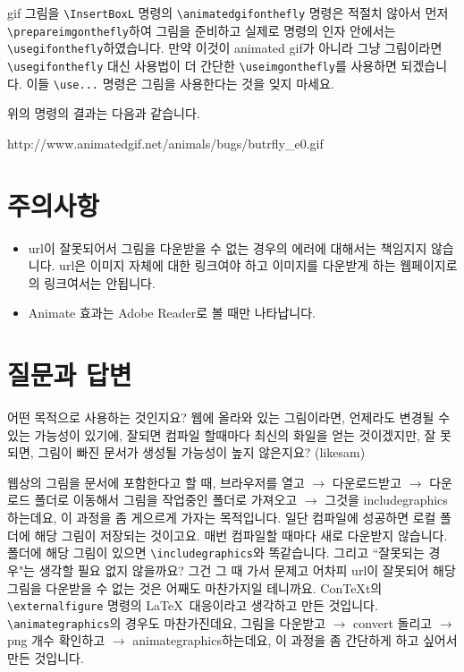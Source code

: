\documentclass[b5paper,nanum]{oblivoir}
\def\cs#1{\texttt{\textbackslash #1}}
\begin{document}
gif 그림을 \cs{InsertBoxL} 명령의  \cs{animatedgifonthefly} 명령은 적절치 않아서 먼저 \cs{prepareimgonthefly}하여 그림을 준비하고 실제로 명령의 인자 안에서는 \cs{usegifonthefly}하였습니다. 만약 이것이 animated gif가 아니라 그냥 그림이라면 \cs{usegifonthefly} 대신 사용법이 더 간단한 \cs{useimgonthefly}를 사용하면 되겠습니다. 이들 \cs{use...} 명령은  그림을 사용한다는 것을 잊지 마세요.

위의 명령의 결과는 다음과 같습니다.

\begin{framed}
%
   {http://www.animatedgif.net/animals/bugs/butrfly_e0.gif}%
%
\jiwon[1]
\end{framed}

\section{주의사항}

\begin{itemize}\firmlist
\item url이 잘못되어서 그림을 다운받을 수 없는 경우의 에러에 대해서는 책임지지 않습니다. url은 이미지 자체에 대한 링크여야 하고 이미지를 다운받게 하는 웹페이지로의 링크여서는 안됩니다.
\item Animate 효과는 Adobe Reader로 볼 때만 나타납니다.
\end{itemize}

\section{질문과 답변}
어떤 목적으로 사용하는 것인지요? 웹에 올라와 있는 그림이라면, 언제라도 변경될 수 있는 가능성이 있기에, 잘되면 컴파일 할때마다 최신의 화일을 얻는 것이겠지만, 잘 못되면, 그림이 빠진 문서가 생성될 가능성이 높지 않은지요? (likesam)

웹상의 그림을 문서에 포함한다고 할 때, 브라우저를 열고 $\rightarrow$ 다운로드받고 $\rightarrow$ 다운로드 폴더로 이동해서 그림을 작업중인 폴더로 가져오고 $\rightarrow$ 그것을 includegraphics하는데요, 이 과정을 좀 게으르게 가자는 목적입니다.
일단 컴파일에 성공하면 로컬 폴더에 해당 그림이 저장되는 것이고요. 매번 컴파일할 때마다 새로 다운받지 않습니다. 폴더에 해당 그림이 있으면 \cs{includegraphics}와 똑같습니다.
그리고 ``잘못되는 경우"는 생각할 필요 없지 않을까요? 그건 그 때 가서 문제고 어차피 url이 잘못되어 해당 그림을 다운받을 수 없는 것은 어째도 마찬가지일 테니까요.
Con\TeX{t}의 \cs{externalfigure} 명령의 \LaTeX\ 대응이라고 생각하고 만든 것입니다.
\cs{animategraphics}의 경우도 마찬가진데요, 그림을 다운받고 $\rightarrow$ convert 돌리고 $\rightarrow$ png 개수 확인하고 $\rightarrow$ animategraphics하는데요, 이 과정을 좀 간단하게 하고 싶어서 만든 것입니다.
\end{document}
